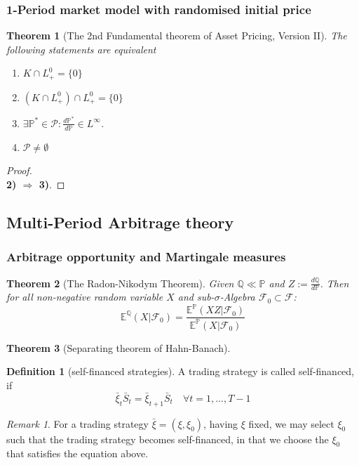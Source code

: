 \documentclass[a4paper,11pt]{book}
\newtheorem{theorem}{Theorem}[section]
\theoremstyle{definition}
\newtheorem{definition}{Definition}[section]
\theoremstyle{remark}
\newtheorem*{remark}{Remark}
\begin{document}
\subsubsection{1-Period market model with randomised initial price}
\begin{theorem}[The 2nd Fundamental theorem of Asset Pricing, Version II]
The following statements are equivalent
\begin{enumerate}
	\item $K \cap L^0_+ = \{0\}$
	\item $(K \cap L^0_+) \cap L_+^0 = \{0\}$
	\item $\exists \mathbb{P}^* \in \mathcal{P}: \frac{d\mathbb{P}^*}{d\mathbb{P}} \in L^\infty$. 
	\item $\mathcal{P} \neq \emptyset$
\end{enumerate}
\end{theorem}
\begin{proof}
\quad\\
\textbf{2) $\Rightarrow$ 3)}.
\end{proof}


\subsection{Multi-Period Arbitrage theory}
\subsubsection{Arbitrage opportunity and Martingale measures}
\begin{theorem}[The Radon-Nikodym Theorem]
	Given $\mathbb{Q} \ll \mathbb{P}$ and $Z := \frac{d\mathbb{Q}}{d\mathbb{P}}$. Then for all non-negative random variable $X$ and sub-$\sigma$-Algebra $\mathcal{F}_0 \subset \mathcal{F}$:
	\begin{equation*}
		\mathbb{E}^{\mathbb{Q}}(X|\mathcal{F}_0) =\frac{\mathbb{E}^{\mathbb{P}}(XZ|\mathcal{F}_0)}{\mathbb{E}^{\mathbb{P}}(X|\mathcal{F}_0)}  
	\end{equation*}
\end{theorem}

\begin{theorem}[Separating theorem of Hahn-Banach]
\end{theorem}

\begin{definition}[self-financed strategies]
	A trading strategy is called self-financed, if
	\begin{equation*}
		\bar{\xi}_t \bar{S}_t = \bar{\xi}_{t+1} \bar{S}_t \quad \forall t = 1, \dots, T-1
	\end{equation*}
\end{definition}
\begin{remark}
For a trading strategy $\bar{\xi} = (\xi, \xi_0)$, having $\xi$ fixed, we may select $\xi_0$ such that the trading strategy becomes self-financed, in that we choose the $\xi_0$ that satisfies the equation above.  
\end{remark}
\end{document}
